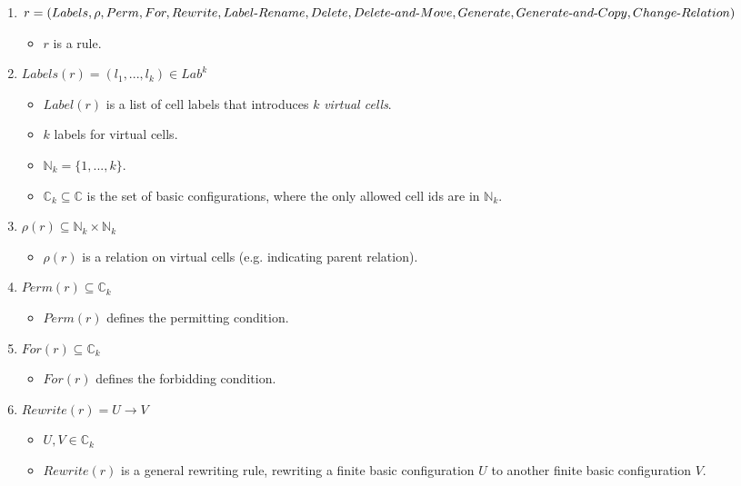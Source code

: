 \documentclass{article}
\newcommand{\mn}{\text{-}}
\begin{document}
\begin{appendices}
\begin{enumerate}
   \item $r = (Labels, \rho, Perm, For, Rewrite, Label\mn Rename, Delete, Delete\mn and\mn Move, Generate, Generate\mn and\mn Copy,\\ Change\mn Relation)$
         \begin{itemize}
         \item $r$ is a rule.
         \end{itemize}
   \item $Labels(r) = (l_1,...,l_k) \in Lab^k$ 
         \begin{itemize}
         \item $Label(r)$ is a list of cell labels that introduces $k$ \textit{virtual cells}.
         \item $k$ labels for virtual cells.
         \item $\mathbb{N}_k = \{1,...,k\}$.
         \item $\mathbb{C}_k \subseteq \mathbb{C}$ is the set of basic configurations, where the only allowed cell ids are in $\mathbb{N}_k$.
         \end{itemize}
   \item $\rho(r) \subseteq \mathbb{N}_k \times \mathbb{N}_k$
         \begin{itemize}
         \item $\rho(r)$ is a relation on virtual cells (e.g. indicating parent relation).
         \end{itemize}
   \item $Perm(r) \subseteq \mathbb{C}_k$
         \begin{itemize}
         \item $Perm(r)$ defines the permitting condition.
         \end{itemize}
   \item $For(r) \subseteq \mathbb{C}_k$
         \begin{itemize}
         \item $For(r)$ defines the forbidding condition.
         \end{itemize}
   \item $Rewrite(r) = U \rightarrow V$
         \begin{itemize}
         \item $U, V \in \mathbb{C}_k$
         \item $Rewrite(r)$ is a general rewriting rule, rewriting a finite basic configuration $U$ to another finite basic configuration $V$.
         \end{itemize}

\end{enumerate}
\end{appendices}
\end{document}
